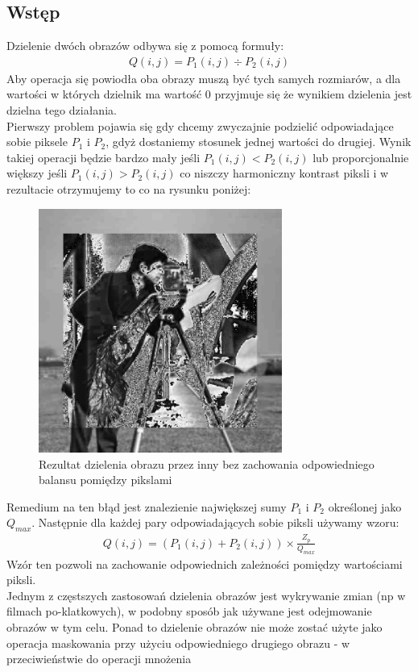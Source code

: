 \documentclass[a4paper,12pt]{book}
\begin{document}
\subsection*{Wstęp}
Dzielenie dwóch obrazów odbywa się z pomocą formuły: 
\begin{gather}
	Q(i,j) = P_1(i,j) \div P_2(i,j)
\end{gather}
Aby operacja się powiodła oba obrazy muszą być tych samych rozmiarów, a dla wartości w których dzielnik ma wartość $0$ przyjmuje się że wynikiem dzielenia jest dzielna tego działania. \\
Pierwszy problem pojawia się gdy chcemy zwyczajnie podzielić odpowiadające sobie piksele $P_1$ i $P_2$, gdyż dostaniemy stosunek jednej wartości do drugiej. Wynik takiej operacji będzie bardzo mały jeśli $P_1(i,j) < P_2(i,j)$ lub proporcjonalnie większy jeśli $P_1(i,j) > P_2(i,j)$ co niszczy harmoniczny kontrast piksli i w rezultacie otrzymujemy to co na rysunku poniżej:
\begin{figure}[H]
	\caption{Rezultat dzielenia obrazu przez inny bez zachowania odpowiedniego balansu pomiędzy pikslami}
	\includegraphics[width=8cm, height=8cm]{2-5/divide-gray-error.png}
\end{figure}
Remedium na ten błąd jest znalezienie największej sumy $P_1$ i $P_2$ określonej jako $Q_{max}$. Następnie dla każdej pary odpowiadających sobie piksli używamy wzoru: 
\begin{gather}
	Q(i,j) = (P_1(i,j) + P_2(i,j)) \times \frac{Z_p}{Q_{max}}
\end{gather}
Wzór ten pozwoli na zachowanie odpowiednich zależności pomiędzy wartościami piksli. \\
Jednym z częstszych zastosowań dzielenia obrazów jest wykrywanie zmian (np w filmach po-klatkowych), w podobny sposób jak używane jest odejmowanie obrazów w tym celu. Ponad to dzielenie obrazów nie może zostać użyte jako operacja maskowania przy użyciu odpowiedniego drugiego obrazu - w przeciwieństwie do operacji mnożenia
\end{document}
